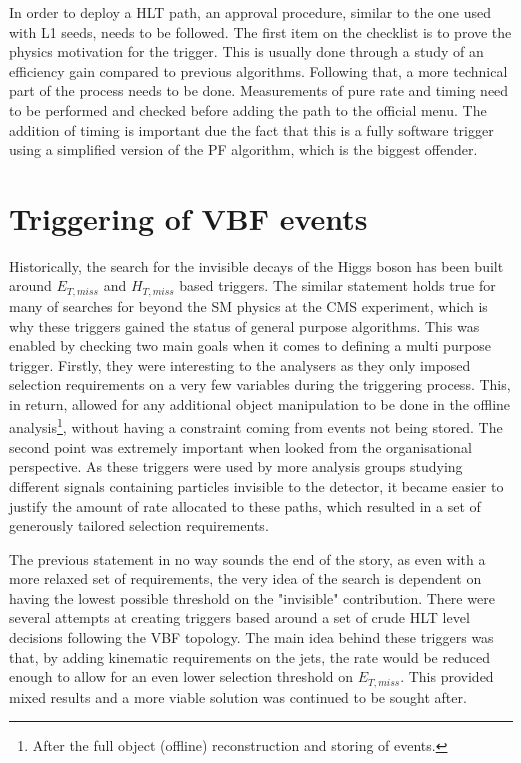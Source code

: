 \hspace{10pt} In order to deploy a HLT path, an approval procedure, similar to the one used with L1 seeds, needs to be followed. The first item on the checklist is to prove the physics motivation for the trigger. This is usually done through a study of an efficiency gain compared to previous algorithms. Following that, a more technical part of the process needs to be done. Measurements of pure rate and timing need to be performed and checked before adding the path to the official menu. The addition of timing is important due the fact that this is a fully software trigger using a simplified version of the PF algorithm, which is the biggest offender.%

\section{Triggering of VBF events}
\label{sec:vbf_trgger}
\hspace{10pt}Historically, the search for the invisible decays of the Higgs boson has been built around $E_{T,miss}$ and $H_{T,miss}$ based triggers. The similar statement holds true for many of searches for beyond the SM physics at the CMS experiment, which is why these triggers gained the status of general purpose algorithms. This was enabled by checking two main goals when it comes to defining a multi purpose trigger. Firstly, they were interesting to the analysers as they only imposed selection requirements on a very few variables during the triggering process. This, in return, allowed for any additional object manipulation to be done in the offline analysis\footnote{After the full object (offline) reconstruction and storing of events.}, without having a constraint coming from events not being stored. The second point was extremely important when looked from the organisational perspective. As these triggers were used by more analysis groups studying different signals containing particles invisible to the detector, it became easier to justify the amount of rate allocated to these paths, which resulted in a set of generously tailored selection requirements.

\hspace{10pt} The previous statement in no way sounds the end of the story, as even with a more relaxed set of requirements, the very idea of the search is dependent on having the lowest possible threshold on the "invisible" contribution. There were several attempts at creating triggers based around a set of crude HLT level decisions following the VBF topology. The main idea behind these triggers was that, by adding kinematic requirements on the jets, the rate would be reduced enough to allow for an even lower selection threshold on $E_{T,miss}$. This provided mixed results and a more viable solution was continued to be sought after.


